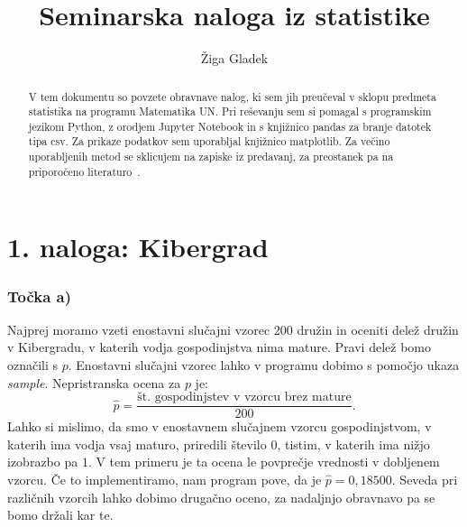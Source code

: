 \documentclass[12pt, letterpaper]{article}
\title{Seminarska naloga iz statistike}
\author{Žiga Gladek}
\begin{document}
\maketitle

\renewcommand{\abstractname}{Povzetek}
\begin{abstract}
V tem dokumentu so povzete obravnave nalog, ki sem jih preučeval v sklopu predmeta statistika na programu Matematika UN. Pri reševanju sem si pomagal s programskim jezikom Python, z orodjem Jupyter Notebook in s knjižnico pandas za branje datotek tipa csv. Za prikaze podatkov sem uporabljal knjižnico matplotlib. Za večino uporabljenih metod se sklicujem na zapiske iz predavanj, za preostanek pa na priporočeno literaturo~\cite{Rice}.
\end{abstract}

\section*{1. naloga: Kibergrad}

\subsubsection*{Točka a)} Najprej moramo vzeti enostavni slučajni vzorec $200$ družin in oceniti delež družin v Kibergradu, v katerih vodja gospodinjstva nima mature. Pravi delež bomo označili s $p$. Enostavni slučajni vzorec lahko v programu dobimo s pomočjo ukaza \emph{sample}. Nepristranska ocena za $p$ je:
\[
\hat{p} = \frac{\text{št. gospodinjstev v vzorcu brez mature}}{200}.
\]
Lahko si mislimo, da smo v enostavnem slučajnem vzorcu gospodinjstvom, v katerih ima vodja vsaj maturo, priredili število $0$, tistim, v katerih ima nižjo izobrazbo pa $1$. V tem primeru je ta ocena le povprečje vrednosti v dobljenem vzorcu. Če to implementiramo, nam program pove, da je $\hat{p} = 0,18500$. Seveda pri različnih vzorcih lahko dobimo drugačno oceno, za nadaljnjo obravnavo pa se bomo držali kar te.
\end{document}
